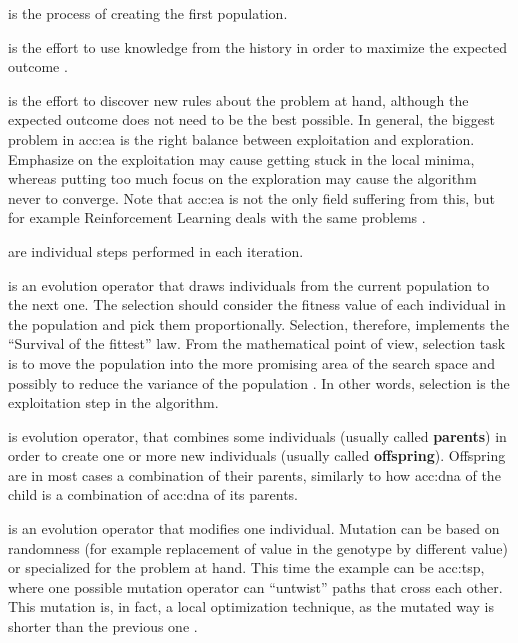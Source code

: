  is the process of creating the first population.

 is the effort to use knowledge from the history in order to maximize the expected outcome \citep{SelfAdaptiveFeaturesInRealParameterEvolutionaryAlgorithms}.

 is the effort to discover new rules about the problem at hand, although the expected outcome does not need to be the best possible. In general, the biggest problem in \acrshort{acc:ea} is the right balance between exploitation and exploration. Emphasize on the exploitation may cause getting stuck in the local minima, whereas putting too much focus on the exploration may cause the algorithm never to converge. Note that \acrshort{acc:ea} is not the only field suffering from this, but for example Reinforcement Learning deals with the same problems \citep{ExplorationExploitationDilemaRL}. 

 are individual steps performed in each iteration.

 is an evolution operator that draws individuals from the current population to the next one. The selection should consider the fitness value of each individual in the population and pick them proportionally. Selection, therefore, implements the \enquote{Survival of the fittest} law. From the mathematical point of view, selection task is to move the population into the more promising area of the search space and possibly to reduce the variance of the population \citep{SelfAdaptiveFeaturesInRealParameterEvolutionaryAlgorithms}. In other words, selection is the exploitation step in the algorithm.

 is evolution operator, that combines some individuals (usually called \textbf{parents}) in order to create one or more new individuals (usually called \textbf{offspring}). Offspring are in most cases a combination of their parents, similarly to how \acrshort{acc:dna} of the child is a combination of \acrshort{acc:dna} of its parents.

 is an evolution operator that modifies one individual. Mutation can be based on randomness (for example replacement of value in the genotype by different value) or specialized for the problem at hand. This time the example can be \acrlong{acc:tsp}, where one possible mutation operator can \enquote{untwist} paths that cross each other. This mutation is, in fact, a local optimization technique, as the mutated way is shorter than the previous one \citep{TSPArticle}.

